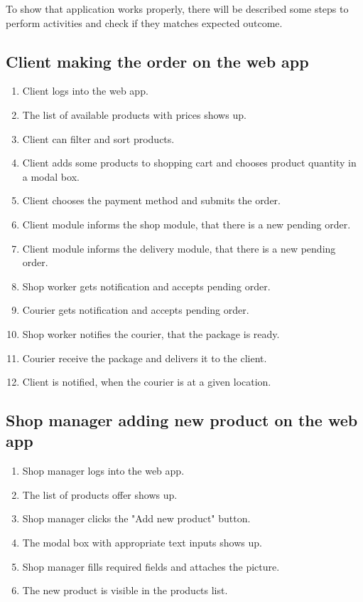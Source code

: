 \documentclass[../main.tex]{subfiles}
\begin{document}
To show that application works properly, there will be described some steps to perform activities and check if they matches expected outcome. 


\subsection{Client making the order on the web app}

\begin{enumerate}
    
    \item Client logs into the web app.
    \item The list of available products with prices shows up.
    \item Client can filter and sort products.
    \item Client adds some products to shopping cart and chooses product quantity in a modal box.
    \item Client chooses the payment method and submits the order.
    \item Client module informs the shop module, that there is a new pending order.
    \item Client module informs the delivery module, that there is a new pending order.
    \item Shop worker gets notification and accepts pending order.
    \item Courier gets notification and accepts pending order.
    \item Shop worker notifies the courier, that the package is ready.
    \item Courier receive the package and delivers it to the client.
    \item Client is notified, when the courier is at a given location.


\end{enumerate}



\subsection{Shop manager adding new product on the web app}

\begin{enumerate}
    \item Shop manager logs into the web app.
    \item The list of products offer shows up.
    \item Shop manager clicks the "Add new product" button.
    \item The modal box with appropriate text inputs shows up.
    \item Shop manager fills required fields and attaches the picture.
    \item The new product is visible in the products list.
\end{enumerate}
\end{document}
